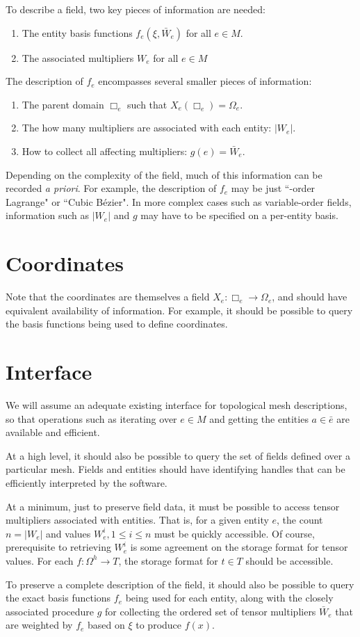 \documentclass{article}
\begin{document}
To describe a field, two key pieces of information are needed:
\begin{enumerate}
\item The entity basis functions $f_e(\xi,\bar{W}_e)$ for all $e\in M$.
\item The associated multipliers $W_e$ for all $e \in M$
\end{enumerate}
The description of $f_e$ encompasses several smaller pieces of information:
\begin{enumerate}
\item The parent domain $\Box_e$ such that $X_e(\Box_e)=\Omega_e$.
\item The how many multipliers are associated with each entity: $|W_e|$.
\item How to collect all affecting multipliers: $g(e) = \bar{W}_e$.
\end{enumerate}
Depending on the complexity of the field, much of this information
can be recorded {\it a priori}.
For example, the description of $f_e$ may be just ``-order Lagrange"
or ``Cubic B\'ezier".
In more complex cases such as variable-order fields, information
such as $|W_e|$ and $g$ may have to be specified on a per-entity basis.

\section{Coordinates}

Note that the coordinates are themselves a field $X_e : \Box_e \to \Omega_e$,
and should have equivalent availability of information.
For example, it should be possible to query the basis functions
being used to define coordinates.

\section{Interface}

We will assume an adequate existing interface for topological
mesh descriptions, so that operations such as iterating over
$e \in M$ and getting the entities $a \in \bar{e}$ are available
and efficient.

At a high level, it should also be possible to query the set of fields
defined over a particular mesh.
Fields and entities should have identifying handles that can be efficiently
interpreted by the software.

At a minimum, just to preserve field data, it must be possible to access
tensor multipliers associated with entities.
That is, for a given entity $e$, the count $n=|W_e|$ and values
$W_e^i,1\leq i\leq n$ must be quickly accessible.
Of course, prerequisite to retrieving $W_e^i$ is some agreement on the
storage format for tensor values.
For each $f : \Omega^h \to T$,
the storage format for $t\in T$ should be accessible.

To preserve a complete description of the field, it should also be
possible to query the exact basis functions $f_e$ being used for
each entity, along with the closely associated procedure $g$ for
collecting the ordered set of tensor multipliers $\bar{W}_e$ that 
are weighted by $f_e$ based on $\xi$ to produce $f(x)$.
\end{document}
